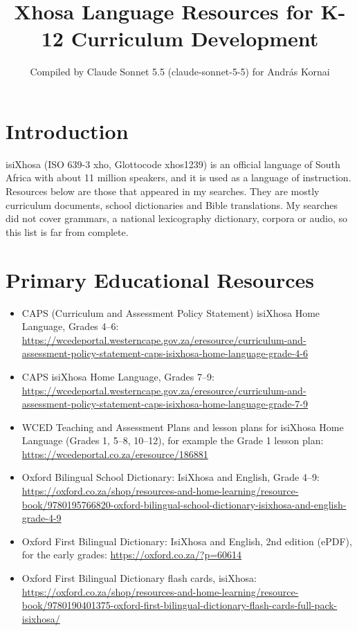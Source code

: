 \documentclass[12pt]{article}
\title{Xhosa Language Resources for K-12 Curriculum Development}
\author{Compiled by Claude Sonnet 5.5 (claude-sonnet-5-5) for Andr\'as Kornai}
\date{}
\begin{document}
\maketitle

\section{Introduction}
isiXhosa (ISO 639-3 xho, Glottocode xhos1239) is an official language of South Africa with about 11 million speakers, and it is used as a language of instruction. Resources below are those that appeared in my searches. They are mostly curriculum documents, school dictionaries and Bible translations. My searches did not cover grammars, a national lexicography dictionary, corpora or audio, so this list is far from complete.

\section{Primary Educational Resources}
\begin{itemize}
\item CAPS (Curriculum and Assessment Policy Statement) isiXhosa Home Language, Grades 4--6: \url{https://wcedeportal.westerncape.gov.za/eresource/curriculum-and-assessment-policy-statement-caps-isixhosa-home-language-grade-4-6}
\item CAPS isiXhosa Home Language, Grades 7--9: \url{https://wcedeportal.westerncape.gov.za/eresource/curriculum-and-assessment-policy-statement-caps-isixhosa-home-language-grade-7-9}
\item WCED Teaching and Assessment Plans and lesson plans for isiXhosa Home Language (Grades 1, 5--8, 10--12), for example the Grade 1 lesson plan: \url{https://wcedeportal.co.za/eresource/186881}
\item Oxford Bilingual School Dictionary: IsiXhosa and English, Grade 4--9: \url{https://oxford.co.za/shop/resources-and-home-learning/resource-book/9780195766820-oxford-bilingual-school-dictionary-isixhosa-and-english-grade-4-9}
\item Oxford First Bilingual Dictionary: IsiXhosa and English, 2nd edition (ePDF), for the early grades: \url{https://oxford.co.za/?p=60614}
\item Oxford First Bilingual Dictionary flash cards, isiXhosa: \url{https://oxford.co.za/shop/resources-and-home-learning/resource-book/9780190401375-oxford-first-bilingual-dictionary-flash-cards-full-pack-isixhosa/}
\end{itemize}
\end{document}
